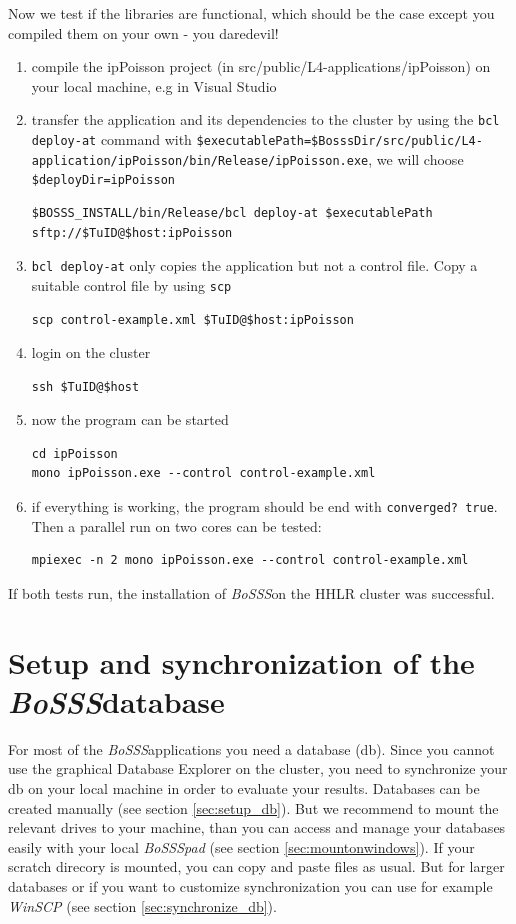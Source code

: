 \documentclass[11pt,twoside,a4paper]{fdyartcl}
\newcommand{\Bosss}{\textit{BoSSS}}
\begin{document}
Now we test if the libraries are functional, which should be the case except you compiled them on your own - you daredevil!
\begin{enumerate}
\item compile the ipPoisson project (in src/public/L4-applications/ipPoisson) on your local machine, e.g in Visual Studio
\item transfer the application and its dependencies to the cluster by using the \verb|bcl deploy-at| command with \verb|$executablePath=$BosssDir/src/public/L4-application/ipPoisson/bin/Release/ipPoisson.exe|, we will choose \verb|$deployDir=ipPoisson| 
\begin{verbatim}
$BOSSS_INSTALL/bin/Release/bcl deploy-at $executablePath sftp://$TuID@$host:ipPoisson
\end{verbatim}
\item \verb|bcl deploy-at| only copies the application but not a control file. Copy a suitable control file by using \verb|scp|
\begin{verbatim}
scp control-example.xml $TuID@$host:ipPoisson
\end{verbatim}
\item login on the cluster
\begin{verbatim}
ssh $TuID@$host
\end{verbatim}
\item now the program can be started
\begin{verbatim}
cd ipPoisson
mono ipPoisson.exe --control control-example.xml
\end{verbatim}
\item if everything is working, the program should be end with \verb|converged? true|. Then a parallel run on two cores can be tested:
\begin{verbatim}
mpiexec -n 2 mono ipPoisson.exe --control control-example.xml
\end{verbatim} 
\end{enumerate}
If both tests run, the installation of \Bosss on the HHLR cluster was successful.

\section{Setup and synchronization of the \Bosss database}
\label{sec:BoSSSdb}
For most of the \Bosss applications you need a database (db). Since you cannot use the graphical Database Explorer on the cluster, you need to synchronize your db on your local machine in order to evaluate your results. Databases can be created manually (see section \ref{sec:setup_db}). But we recommend to mount the relevant drives to your machine, than you can access and manage your databases easily with your local \emph{BoSSSpad} (see section \ref{sec:mountonwindows}).
If your scratch direcory is mounted, you can copy and paste files as usual. But for larger databases or if you want to customize synchronization you can use for example \emph{WinSCP} (see section \ref{sec:synchronize_db}).
\end{document}
